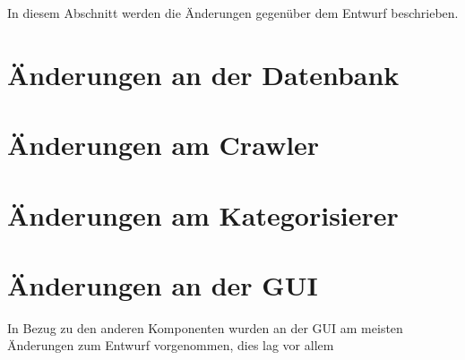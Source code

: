 In diesem Abschnitt werden die Änderungen gegenüber dem Entwurf beschrieben.
\section{Änderungen an der Datenbank}

\section{Änderungen am Crawler}

\section{Änderungen am Kategorisierer}

\section{Änderungen an der GUI}

In Bezug zu den anderen Komponenten wurden an der GUI am meisten Änderungen zum Entwurf vorgenommen, dies lag vor allem